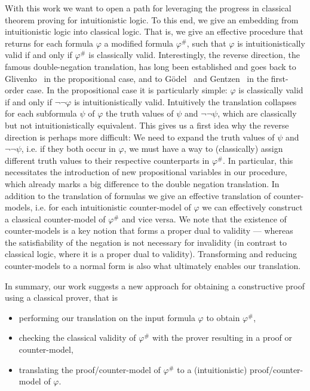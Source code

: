 \documentclass[runningheads]{llncs}
\begin{document}
With this work we want to open a path for leveraging the progress in classical theorem proving for intuitionistic logic.
To this end, we give an embedding from intuitionistic logic into classical logic. That is, we give an effective procedure that returns for each formula $\varphi$ a modified formula $\varphi^\#$, such that $\varphi$ is intuitionistically valid if and only if $\varphi^\#$ is classically valid.
Interestingly, the reverse direction, the famous double-negation translation, has long been established and goes back to Glivenko~\cite{glivenko1929quelques} in the propositional case, and to G\"odel~\cite{godel1933intuitionistischen} and Gentzen~\cite{gentzen1936widerspruchsfreiheit} in the first-order case. In the propositional case it is particularly simple: $\varphi$ is classically valid if and only if $\neg\neg\varphi$ is intuitionistically valid. Intuitively the translation collapses for each subformula $\psi$ of $\varphi$ the truth values of $\psi$ and $\neg\neg\psi$, which are classically but not intuitionistically equivalent. This gives us a first idea why the reverse direction is perhaps more difficult: We need to expand the truth values of $\psi$ and $\neg\neg\psi$, i.e. if they both occur in $\varphi$, we must have a way to (classically) assign different truth values to their respective counterparts in $\varphi^\#$. In particular, this necessitates the introduction of new propositional variables in our procedure, which already marks a big difference to the double negation translation.
%
In addition to the translation of formulas we give an effective translation of counter-models, i.e. for each intuitionistic counter-model of $\varphi$ we can effectively construct a classical counter-model of $\varphi^\#$ and vice versa.
We note that the existence of counter-models is a key notion that forms a proper dual to validity --- whereas the satisfiability of the negation is not necessary for invalidity (in contrast to classical logic, where it is a proper dual to validity).
Transforming and reducing counter-models to a normal form is also what ultimately enables our translation.

In summary, our work suggests a new approach for obtaining a constructive proof using a classical prover, that is
\begin{itemize}
	\item performing our translation on the input formula $\varphi$ to obtain $\varphi^\#$,
	\item checking the classical validity of $\varphi^\#$ with the prover resulting in a proof or counter-model,
	\item translating the proof/counter-model of $\varphi^\#$ to a (intuitionistic) proof/counter-model of $\varphi$.
\end{itemize}
\end{document}
